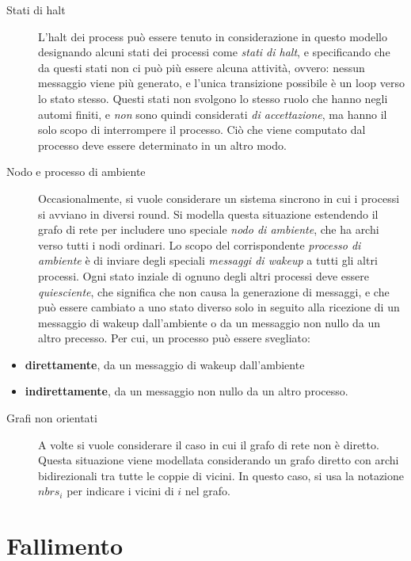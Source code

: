 \documentclass[italian,]{book}
\providecommand{\tightlist}{%
  \setlength{\itemsep}{0pt}\setlength{\parskip}{0pt}}
\begin{document}
\begin{description}
\item[Stati di halt]
L'halt dei process può essere tenuto in considerazione in questo modello
designando alcuni stati dei processi come \emph{stati di halt}, e
specificando che da questi stati non ci può più essere alcuna attività,
ovvero: nessun messaggio viene più generato, e l'unica transizione
possibile è un loop verso lo stato stesso. Questi stati non svolgono lo
stesso ruolo che hanno negli automi finiti, e \emph{non} sono quindi
considerati \emph{di accettazione}, ma hanno il solo scopo di
interrompere il processo. Ciò che viene computato dal processo deve
essere determinato in un altro modo.
\item[Nodo e processo di ambiente]
Occasionalmente, si vuole considerare un sistema sincrono in cui i
processi si avviano in diversi round. Si modella questa situazione
estendendo il grafo di rete per includere uno speciale \emph{nodo di
ambiente}, che ha archi verso tutti i nodi ordinari. Lo scopo del
corrispondente \emph{processo di ambiente} è di inviare degli speciali
\emph{messaggi di wakeup} a tutti gli altri processi. Ogni stato inziale
di ognuno degli altri processi deve essere \emph{quiesciente}, che
significa che non causa la generazione di messaggi, e che può essere
cambiato a uno stato diverso solo in seguito alla ricezione di un
messaggio di wakeup dall'ambiente o da un messaggio non nullo da un
altro precesso. Per cui, un processo può essere svegliato:
\end{description}

\begin{itemize}
\tightlist
\item
  \textbf{direttamente}, da un messaggio di wakeup dall'ambiente
\item
  \textbf{indirettamente}, da un messaggio non nullo da un altro
  processo.
\end{itemize}

\begin{description}
\item[Grafi non orientati]
A volte si vuole considerare il caso in cui il grafo di rete non è
diretto. Questa situazione viene modellata considerando un grafo diretto
con archi bidirezionali tra tutte le coppie di vicini. In questo caso,
si usa la notazione \(nbrs_i\) per indicare i vicini di \(i\) nel grafo.
\end{description}

\hypertarget{fallimento}{%
\section{Fallimento}\label{fallimento}}
\end{document}
